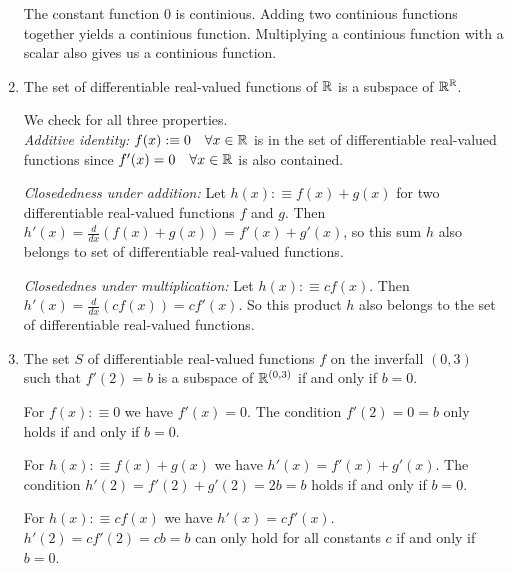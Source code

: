 \begin{xrcs}
\begin{enumerate}
{      \begin{xsol}
        The constant function $0$ is continious. Adding two continious functions together yields a continious function. Multiplying a continious function with a scalar also gives us a continious function.
      \end{xsol}
    }

    \item{
      The set of differentiable real-valued functions of $\mathbb{R}$ is a subspace of $\mathbb{R}^{\mathbb{R}}$.

      \begin{xsol}
        We check for all three properties. \\
        \emph{Additive identity:} $f(x) :\equiv 0 \quad \forall x \in \mathbb{R}$ is in the set of differentiable real-valued functions since $f'(x) = 0 \quad \forall x \in \mathbb{R}$ is also contained.

        \emph{Closededness under addition:} Let $h(x) :\equiv f(x) + g(x)$ for two differentiable real-valued functions $f$ and $g$. Then $h'(x) = \frac{d}{dx} (f(x)+g(x)) = f'(x) + g'(x)$, so this sum $h$ also belongs to set of differentiable real-valued functions.

        \emph{Closedednes under multiplication:} Let $h(x) :\equiv c f(x)$. Then $h'(x) = \frac{d}{dx} (c f(x)) = c f'(x)$. So this product $h$ also belongs to the set of differentiable real-valued functions.
      \end{xsol}
    }

    \item{
      The set $S$ of differentiable real-valued functions $f$ on the inverfall $(0,3)$ such that $f'(2) = b$ is a subspace of $\mathbb{R}^{(0,3)}$ if and only if $b=0$.

      \begin{xsol}
        For $f(x) :\equiv 0$ we have $f'(x) = 0$. The condition $f'(2) =  0 = b$ only holds if and only if $b=0$.

      For $h(x) :\equiv f(x) + g(x)$ we have $h'(x) = f'(x) + g'(x)$. The condition $h'(2) = f'(2) + g'(2) = 2b = b$  holds if and only if $b=0$.

      For $h(x) :\equiv cf(x)$ we have $h'(x) = cf'(x)$. $h'(2) = cf'(2) = cb = b$ can only hold for all constants $c$ if and only if $b=0$.
      \end{xsol}
    }
  \end{enumerate}
\end{xrcs}


